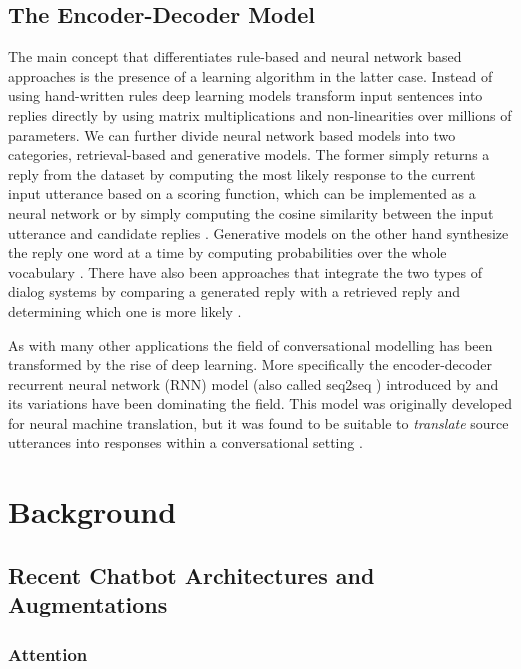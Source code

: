 \documentclass[12pt]{article}
\begin{document}
\subsection{The Encoder-Decoder Model} \label{ssec:23}
The main concept that differentiates rule-based and neural network based approaches is the presence of a learning algorithm in the latter case. Instead of using hand-written rules deep learning models transform input sentences into replies directly by using matrix multiplications and non-linearities over millions of parameters. We can further divide neural network based models into two categories, retrieval-based and generative models. The former simply returns a reply from the dataset by computing the most likely response to the current input utterance based on a scoring function, which can be implemented as a neural network \cite{Cho:2014} or by simply computing the cosine similarity between the input utterance and candidate replies \cite{stalemate:2016}. Generative models on the other hand synthesize the reply one word at a time by computing probabilities over the whole vocabulary \cite{Sutskever:2014,Vinyals:2015}. There have also been approaches that integrate the two types of dialog systems by comparing a generated reply with a retrieved reply and determining which one is more likely \cite{Song:2016}.

As with many other applications the field of conversational modelling has been transformed by the rise of deep learning. More specifically the encoder-decoder recurrent neural network (RNN) model (also called seq2seq \cite{Sutskever:2014}) introduced by \cite{Cho:2014} and its variations have been dominating the field. This model was originally developed for neural machine translation, but it was found to be suitable to \textit{translate} source utterances into responses within a conversational setting \cite{Shang:2015,Vinyals:2015}.




\newpage\section{Background} \label{sec:background}
\subsection{Recent Chatbot Architectures and Augmentations} \label{ssec:31}
\subsubsection{Attention}
\end{document}
